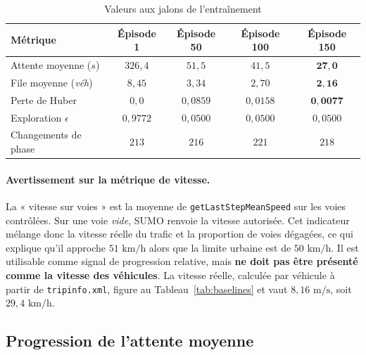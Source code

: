 \documentclass[11pt,a4paper]{article}
\begin{document}
\begin{table}[H]
\centering
\caption{Valeurs aux jalons de l'entraînement}
\label{tab:jalons}
\vspace{0.2cm}
\begin{tabular}{lcccc}
\toprule
\textbf{Métrique} & \textbf{Épisode 1} & \textbf{Épisode 50} & \textbf{Épisode 100} & \textbf{Épisode 150} \\
\midrule
Attente moyenne ($s$)         & $326{,}4$ & $51{,}5$   & $41{,}5$   & $\mathbf{27{,}0}$ \\
File moyenne (\textit{véh})   & $8{,}45$  & $3{,}34$   & $2{,}70$   & $\mathbf{2{,}16}$ \\
Perte de Huber                & $0{,}0$   & $0{,}0859$ & $0{,}0158$ & $\mathbf{0{,}0077}$ \\
Exploration $\epsilon$        & $0{,}9772$& $0{,}0500$ & $0{,}0500$ & $0{,}0500$ \\
Changements de phase          & $213$     & $216$      & $221$      & $218$ \\
\bottomrule
\end{tabular}
\end{table}

\paragraph{Avertissement sur la métrique de vitesse.} La « vitesse sur voies » est la
moyenne de \texttt{getLastStepMeanSpeed} sur les voies contrôlées. Sur une voie
\emph{vide}, SUMO renvoie la vitesse autorisée. Cet indicateur mélange donc la vitesse
réelle du trafic et la proportion de voies dégagées, ce qui explique qu'il approche
$51\text{ km/h}$ alors que la limite urbaine est de $50\text{ km/h}$. Il est
utilisable comme signal de progression relative, mais \textbf{ne doit pas être
présenté comme la vitesse des véhicules}. La vitesse réelle, calculée par véhicule à
partir de \texttt{tripinfo.xml}, figure au Tableau~\ref{tab:baselines} et vaut
$8{,}16\text{ m/s}$, soit $29{,}4\text{ km/h}$.

\subsection{Progression de l'attente moyenne}
\end{document}
